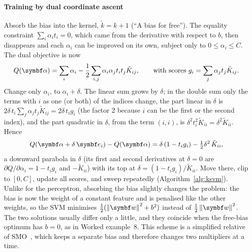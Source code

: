 \documentclass[11pt]{article}
\newcommand{\w}{\vect{w}}
\newcommand{\valpha}{\vect{\alpha}}
\begin{document}
\paragraph{Training by dual coordinate ascent} Absorb the bias into the kernel, $\tilde k = k + 1$ (``A bias for free'').
The equality constraint $\sum_i\alpha_it_i = 0$, which came from the derivative with respect to $b$, then disappears and
each $\alpha_i$ can be improved on its own, subject only to $0 \le \alpha_i \le C$. The dual objective is now
\[
  Q(\valpha) = \sum_i \alpha_i - \frac12\sum_{i,j}\alpha_i\alpha_jt_it_j\tilde K_{ij} ,
  \qquad \text{with scores } g_i = \sum_j \alpha_j t_j \tilde K_{ij} .
\]
Change only $\alpha_i$, to $\alpha_i + \delta$. The linear sum grows by $\delta$; in the double sum only the terms with $i$ as one (or both) of the indices change, the
part linear in $\delta$ is $2\delta\,t_i\sum_j\alpha_jt_j\tilde K_{ij} = 2\delta\,t_ig_i$ (the factor 2 because $i$ can be
the first or the second index), and the part quadratic in $\delta$, from the term $(i, i)$, is $\delta^2 t_i^2\tilde K_{ii}
= \delta^2\tilde K_{ii}$. Hence
\[
  Q(\valpha + \delta\,\vect{e}_i) - Q(\valpha) = \delta\,(1 - t_ig_i) - \tfrac12\delta^2\,\tilde K_{ii} ,
\]
a downward parabola in $\delta$ (its first and second derivatives at $\delta = 0$ are $\partial Q/\partial\alpha_i =
1 - t_ig_i$ and $-\tilde K_{ii}$) with its top at $\delta = (1 - t_ig_i)/\tilde K_{ii}$. Move there, clip to $[0, C]$,
update all scores, and sweep repeatedly (Algorithm~\ref{alg:ksvm}). Unlike for the perceptron, absorbing the bias
slightly changes the problem: the bias is now the weight of a constant feature and is penalised like the other weights,
so the SVM minimises $\frac12(\norm{\w}^2 + b^2)$ instead of $\frac12\norm{\w}^2$. The two solutions usually differ only
a little, and they coincide when the free-bias optimum has $b = 0$, as in Worked example~8. This scheme is a simplified
relative of SMO~\cite{platt1998}, which keeps a separate bias and therefore changes two multipliers at a time.
\end{document}
